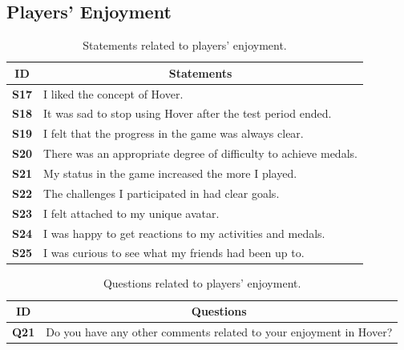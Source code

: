 \subsection*{Players' Enjoyment}
\begin{table}[H]
    \centering
    \begin{tabularx}{\textwidth}{|c|X|}
        \hline
        \textbf{ID} & \multicolumn{1}{c|}{\textbf{Statements}} \\ \hline
        \textbf{S17} & I liked the concept of Hover. \\
        \textbf{S18} & It was sad to stop using Hover after the test period ended. \\
        \textbf{S19} & I felt that the progress in the game was always clear. \\
        \textbf{S20} & There was an appropriate degree of difficulty to achieve medals. \\
        \textbf{S21} & My status in the game increased the more I played. \\
        \textbf{S22} & The challenges I participated in had clear goals. \\
        \textbf{S23} & I felt attached to my unique avatar. \\
        \textbf{S24} & I was happy to get reactions to my activities and medals. \\
        \textbf{S25} & I was curious to see what my friends had been up to. \\
         \hline
    \end{tabularx}
    \caption{Statements related to players' enjoyment.}
    \label{tab:appendix_player_enjoyment_statements}
\end{table}

\begin{table}[H]
    \centering
    \begin{tabularx}{\textwidth}{|c|X|}
        \hline
        \textbf{ID} & \multicolumn{1}{c|}{\textbf{Questions}} \\ \hline
        \textbf{Q21} & Do you have any other comments related to your enjoyment in Hover? \\ \hline
    \end{tabularx}
    \caption{Questions related to players' enjoyment.}
    \label{tab:appendix_player_enjoyment_questions}
\end{table}

